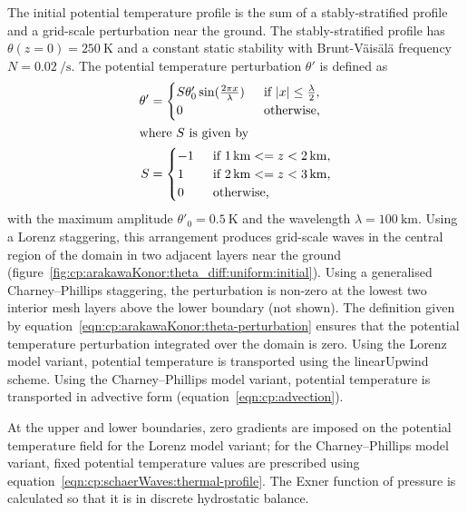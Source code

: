 The initial potential temperature profile is the sum of a stably-stratified profile and a grid-scale perturbation near the ground.
The stably-stratified profile has $\theta(z = 0) = \SI{250}{\kelvin}$ and a constant static stability with Brunt-V\"ais\"al\"a frequency $N = \SI{0.02}{\per\second}$.
The potential temperature perturbation $\theta'$ is defined as
\begin{subequations}
\label{eqn:cp:arakawaKonor:theta-perturbation}
\begin{align}
	\theta' &= \begin{cases}
		S \theta'_0 \sin(\frac{2 \pi x}{\lambda}) & \enskip \text{if $\left\lvert x \right\rvert \leq \frac{\lambda}{2}$,} \\
		0 & \enskip \text{otherwise,} \\
	\end{cases} \\
\shortintertext{where $S$ is given by}
	S &= \begin{cases}
		-1 & \enskip \text{if $\SI{1}{\kilo\meter} <= z < \SI{2}{\kilo\meter}$,} \\
		1 & \enskip \text{if $\SI{2}{\kilo\meter} <= z < \SI{3}{\kilo\meter}$,} \\
		0 & \enskip \text{otherwise,} \\
	\end{cases}
\end{align}%
\end{subequations}
with the maximum amplitude $\theta'_0 = \SI{0.5}{\kelvin}$ and the wavelength $\lambda = \SI{100}{\kilo\meter}$.
Using a Lorenz staggering, this arrangement produces grid-scale waves in the central region of the domain in two adjacent layers near the ground (figure~\ref{fig:cp:arakawaKonor:theta_diff:uniform:initial}).
Using a generalised Charney--Phillips staggering, the perturbation is non-zero at the lowest two interior mesh layers above the lower boundary (not shown).
The definition given by equation~\eqref{eqn:cp:arakawaKonor:theta-perturbation} ensures that the potential temperature perturbation integrated over the domain is zero.
Using the Lorenz model variant, potential temperature is transported using the linearUpwind scheme.
Using the Charney--Phillips model variant, potential temperature is transported in advective form (equation~\ref{eqn:cp:advection}).

At the upper and lower boundaries, zero gradients are imposed on the potential temperature field for the Lorenz model variant; for the Charney--Phillips model variant, fixed potential temperature values are prescribed using equation~\ref{eqn:cp:schaerWaves:thermal-profile}.
The Exner function of pressure is calculated so that it is in discrete hydrostatic balance.

